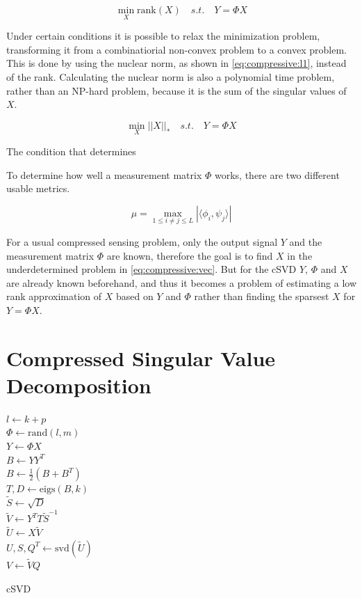 \begin{equation} \label{eq:compressive:l0}
    \min_{X} \mathrm{rank}(X) \quad s.t. \quad Y = \Phi X
\end{equation}

Under certain conditions it is possible to relax the minimization problem, transforming it from a combinatiorial non-convex problem to a convex problem. This is done by using the nuclear norm, as shown in \eqref{eq:compressive:l1}, instead of the rank. Calculating the nuclear norm is also a polynomial time problem, rather than an NP-hard problem, because it is the sum of the singular values of $X$.

\begin{equation} \label{eq:compressive:l1}
    \min_{X} ||X||_* \quad s.t. \quad Y = \Phi X
\end{equation}

The condition that determines 

To determine how well a measurement matrix $\Phi$ works, there are two different usable metrics. 

\begin{equation}
    \mu = \max_{1 \le i \neq j \le L} | \langle \phi_i,\psi_j \rangle |
\end{equation}

For a usual compressed sensing problem, only the output signal $Y$ and the measurement matrix $\Phi$ are known, therefore the goal is to find $X$ in the underdetermined problem in \eqref{eq:compressive:vec}. But for the cSVD $Y$, $\Phi$ and $X$ are already known beforehand, and thus it becomes a problem of estimating a low rank approximation of $X$ based on $Y$ and $\Phi$ rather than finding the sparsest $X$ for $Y = \Phi X$.




\section{Compressed Singular Value Decomposition}




\begin{algorithm}[H]
\SetAlgoLined
{}
$l \gets k + p$ \\
$\Phi \gets \mathrm{rand}(l, m)$ \\
$Y \gets \Phi X$ \\
$B \gets Y Y^T$ \\
$B \gets \frac{1}{2}(B + B^T)$ \\
$T,D \gets \mathrm{eigs}(B,k)$ \\
$\tilde S \gets \sqrt{D}$ \\
$\tilde V \gets Y^T T \tilde S^{-1}$ \\
$\tilde U \gets X \tilde V$ \\
$U,S,Q^T \gets \mathrm{svd}(\tilde U)$ \\ %
$V \gets \tilde V Q$ \\
\caption{cSVD}
\end{algorithm}


